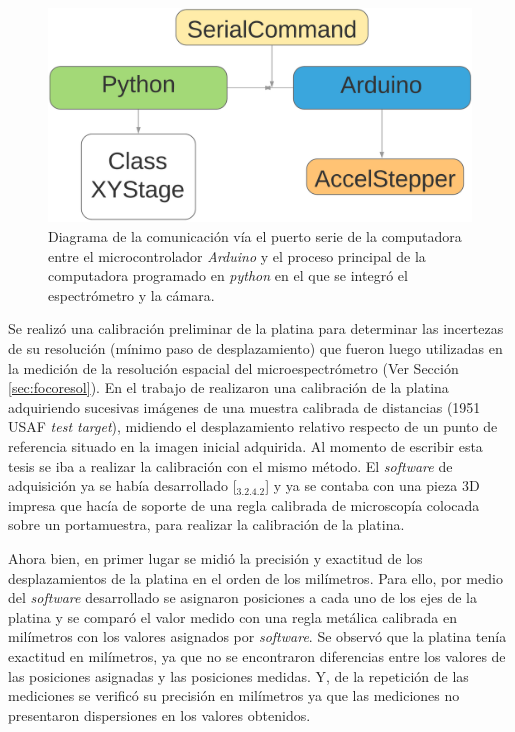 \begin{figure}[H]
	\centering
	\includegraphics[scale=0.5]{Figs/microespectrometro/diagflujoplatina.png}
	\caption{Diagrama de la comunicación vía el puerto serie de la computadora entre el microcontrolador \textit{Arduino} y el proceso principal de la computadora programado en \textit{python} en el que se integró el espectrómetro y la cámara.}
	\label{fig:cnpl}
\end{figure}

Se realizó una calibración preliminar de la platina para determinar las incertezas de su resolución (mínimo paso de desplazamiento) que fueron luego utilizadas en la medición de la resolución espacial del microespectrómetro (Ver Sección \ref{sec:focoresol}). En el trabajo de \cite{schaa} realizaron una calibración de la platina adquiriendo sucesivas imágenes de una muestra calibrada de distancias (1951 USAF \textit{test target}), midiendo el desplazamiento relativo respecto de un punto de referencia situado en la imagen inicial adquirida. Al momento de escribir esta tesis se iba a realizar la calibración con el mismo método. El \textit{software} de adquisición ya se había desarrollado [\href{https://github.com/jrr1984/defectsGUI/blob/master/views.py}{\faGithub$_{3.2.4.2}$}] y ya se contaba con una pieza 3D impresa que hacía de soporte de una regla calibrada de microscopía colocada sobre un portamuestra, para realizar la calibración de la platina.

Ahora bien, en primer lugar se midió la precisión y exactitud de los desplazamientos de la platina en el orden de los milímetros. Para ello, por medio del \textit{software} desarrollado se asignaron posiciones a cada uno de los ejes de la platina y se comparó el valor medido con una regla metálica calibrada en milímetros con los valores asignados por \textit{software}. Se observó que la platina tenía exactitud en milímetros, ya que no se encontraron diferencias entre los valores de las posiciones asignadas y las posiciones medidas. Y, de la repetición de las mediciones se verificó su precisión en milímetros ya que las mediciones no presentaron dispersiones en los valores obtenidos.

